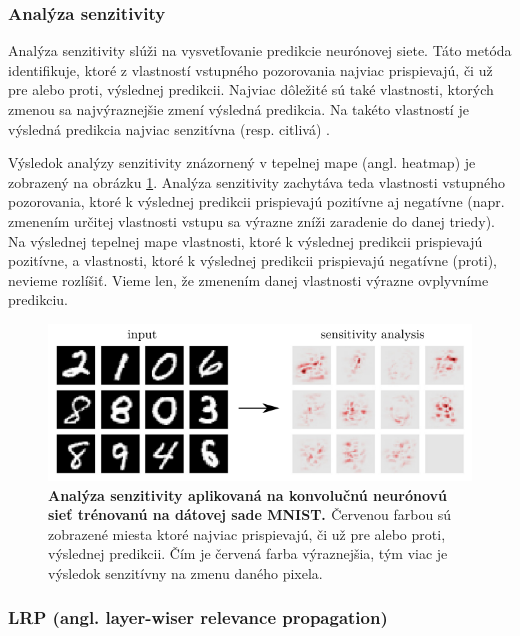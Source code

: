 \subsubsection{Analýza senzitivity}

Analýza senzitivity slúži na vysvetľovanie predikcie neurónovej siete. Táto metóda identifikuje, ktoré z vlastností vstupného pozorovania najviac prispievajú, či už pre alebo proti, výslednej predikcii. Najviac dôležité sú také vlastnosti, ktorých zmenou sa najvýraznejšie zmení výsledná predikcia. Na takéto vlastností je výsledná predikcia najviac senzitívna (resp. citlivá) \cite{montavon2018methods}.

Výsledok analýzy senzitivity znázornený v tepelnej mape (angl. heatmap) je zobrazený na obrázku \ref{fig:sensitivity_analysis}. Analýza senzitivity zachytáva teda vlastnosti vstupného pozorovania, ktoré k výslednej predikcii prispievajú pozitívne aj negatívne (napr. zmenením určitej vlastnosti vstupu sa výrazne zníži zaradenie do danej triedy). Na výslednej tepelnej mape vlastnosti, ktoré k výslednej predikcii prispievajú pozitívne, a vlastnosti, ktoré k výslednej predikcii prispievajú negatívne (proti), nevieme rozlíšiť. Vieme len, že zmenením danej vlastnosti výrazne ovplyvníme predikciu.

\begin{figure}[h!]
\centering
\includegraphics[scale=0.5]{assets/images/sensitivity_analysis.png}
\caption{\textbf{Analýza senzitivity aplikovaná na konvolučnú neurónovú sieť trénovanú na dátovej sade MNIST. \cite{montavon2018methods}} Červenou farbou sú zobrazené miesta ktoré najviac prispievajú, či už pre alebo proti, výslednej predikcii. Čím je červená farba výraznejšia, tým viac je výsledok senzitívny na zmenu daného pixela.}
\label{fig:sensitivity_analysis}
\end{figure}

\subsubsection{LRP (angl. layer-wiser relevance propagation)}

